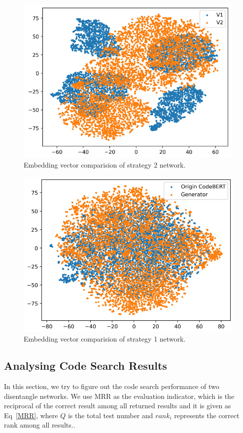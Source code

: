 \begin{figure}[htb]
	\centering
	\includegraphics[width=0.9\linewidth]{imgs/st2_emb.png}
	\caption{Embedding vector comparision of strategy 2 network.}
	\label{fig:st2_emb}
\end{figure}

\begin{figure}[htb]
	\centering
	\includegraphics[width=0.9\linewidth]{imgs/gan_emb.png}
	\caption{Embedding vector comparision of strategy 1 network.}
	\label{fig:st2_gan}
\end{figure}

\subsection{Analysing Code Search Results}
In this section, 
we try to figure out the code search performance of two disentangle networks. 
We use MRR as the evaluation indicator, 
which is the reciprocal of the correct result among all returned results 
and it is given as Eq~\ref{MRR}, where $Q$ is the total test number and $rank_i$ represents the correct rank among all results..


